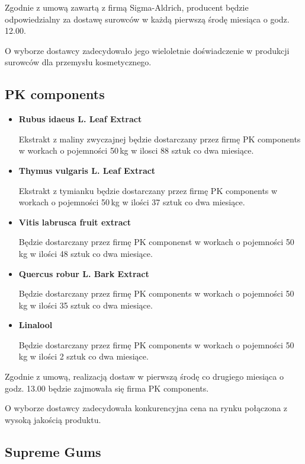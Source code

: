 	Zgodnie z umową zawartą z firmą \textsf{Sigma-Aldrich}, producent będzie odpowiedzialny za dostawę surowców w każdą pierwszą środę miesiąca o godz. 12.00.

	O wyborze dostawcy zadecydowało jego wieloletnie doświadczenie w produkcji surowców dla przemysłu kosmetycznego.

\subsection{\textsf{PK components}}

\begin{itemize}
	\item \textbf{Rubus idaeus L. Leaf Extract}

	Ekstrakt z maliny zwyczajnej będzie dostarczany przez firmę \textsf{PK components} w workach o pojemności 50\,kg w ilosci 88 sztuk co dwa miesiące.
	\item \textbf{Thymus vulgaris L. Leaf Extract}

	Ekstrakt z tymianku będzie dostarczany przez firmę \textsf{PK components} w workach o pojemności 50\,kg w ilości 37 sztuk co dwa miesiące.
	\item \textbf{Vitis labrusca fruit extract }

	Będzie dostarczany przez firmę PK componenst w workach o pojemności 50\,kg w ilości 48 sztuk co dwa miesiące.
	\item \textbf{Quercus robur L. Bark Extract}

	Będzie dostarczany przez firmę \textsf{PK components} w workach o pojemności 50\,kg w ilości 35 sztuk co dwa miesiące.
	\item \textbf{Linalool}

	Będzie dostarczany przez firmę \textsf{PK components} w workach o pojemności 50\,kg w ilości 2 sztuk co dwa miesiące.
\end{itemize}\vspace{\baselineskip}

	Zgodnie z umową, realizacją dostaw w pierwszą środę co drugiego miesiąca o godz. 13.00 będzie zajmowała się firma \textsf{PK components}.

	O wyborze dostawcy zadecydowała konkurencyjna cena na rynku połączona z wysoką jakością produktu.

\subsection{\textsf{Supreme Gums}}

